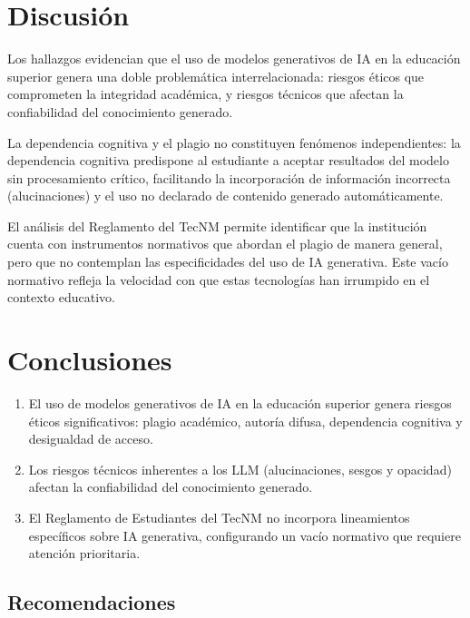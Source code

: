 \documentclass[review]{elsarticle}
\begin{document}
	\section{Discusión}
	
	Los hallazgos evidencian que el uso de modelos generativos de IA en la educación superior genera una doble problemática interrelacionada: riesgos éticos que comprometen la integridad académica, y riesgos técnicos que afectan la confiabilidad del conocimiento generado.
	
	La dependencia cognitiva y el plagio no constituyen fenómenos independientes: la dependencia cognitiva predispone al estudiante a aceptar resultados del modelo sin procesamiento crítico, facilitando la incorporación de información incorrecta (alucinaciones) y el uso no declarado de contenido generado automáticamente.
	
	El análisis del Reglamento del TecNM permite identificar que la institución cuenta con instrumentos normativos que abordan el plagio de manera general, pero que no contemplan las especificidades del uso de IA generativa. Este vacío normativo refleja la velocidad con que estas tecnologías han irrumpido en el contexto educativo.
	
	\section{Conclusiones}
	
	\begin{enumerate}
		\item El uso de modelos generativos de IA en la educación superior genera riesgos éticos significativos: plagio académico, autoría difusa, dependencia cognitiva y desigualdad de acceso.
		
		\item Los riesgos técnicos inherentes a los LLM (alucinaciones, sesgos y opacidad) afectan la confiabilidad del conocimiento generado.
		
		\item El Reglamento de Estudiantes del TecNM \citep{tecnm2023} no incorpora lineamientos específicos sobre IA generativa, configurando un vacío normativo que requiere atención prioritaria.
	\end{enumerate}
	
	\subsection{Recomendaciones}
	
\end{document}
